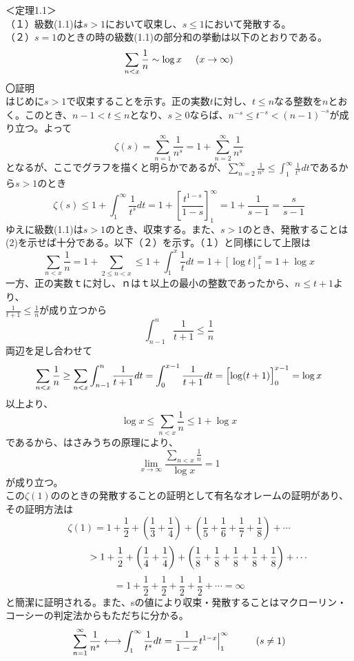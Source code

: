 \documentclass{jsarticle}
\begin{document}
＜定理1.1＞\\
（１）級数(1.1)は\(s>1\)において収束し、\(s\leq1\)において発散する。\\
（２）\(s=1\)のときの時の級数(1.1)の部分和の挙動は以下のとおりである。
\begin{equation}
\sum_{n<x}\frac{1}{n}\sim\log x\hspace{5mm}(x\rightarrow\infty)
\end{equation}
〇証明\\
はじめに\(s>1\)で収束することを示す。正の実数\(t\)に対し、\(t\leq n\)なる整数を\(n\)とおく。このとき、\(n-1<t\leq n\)となり、\(s\geq0\)ならば、\(n^{-s}\leq t^{-s}<(n-1)^{-s}\)が成り立つ。よって
\[\zeta(s)=\sum_{n=1}^{\infty}\frac{1}{n^{s}}=1+\sum_{n=2}^{\infty}\frac{1}{n^{s}}\]
となるが、ここでグラフを描くと明らかであるが、\(\displaystyle\sum_{n=2}^{\infty}\frac{1}{n^{s}}\leq\int_{1}^{\infty}\frac{1}{t^{s}}dt\)であるから\(s>1\)のとき
\[\zeta(s)\leq1+\int_{1}^{\infty}\frac{1}{t^{s}}dt=1+\left[\frac{t^{1-s}}{1-s}\right]_{1}^{\infty}=1+\frac{1}{s-1}=\frac{s}{s-1}\]
ゆえに級数(1.1)は\(s>1\)のとき、収束する。また、\(s>1\)のとき、発散することは(2)を示せば十分である。以下（２）を示す。（１）と同様にして上限は
\[\displaystyle\sum_{n<x}\frac{1}{n}=1+\sum_{2\leq n<x}\leq1+\int_{1}^{x}\frac{1}{t}dt=1+\left[\log t\right]_{1}^{x}=1+\log x\]
一方、正の実数ｔに対し、ｎはｔ以上の最小の整数であったから、\(n\leq t+1\)より、\\
\(\frac{1}{t+1}\leq\frac{1}{n}\)が成り立つから
\[\int_{n-1}^{n}\frac{1}{t+1}\leq\frac{1}{n}\]
両辺を足し合わせて
\[\displaystyle\sum_{n<x}\frac{1}{n}\geq\sum_{n<x}\int_{n-1}^{n}\frac{1}{t+1}dt=\int_{0}^{x-1}\frac{1}{t+1}dt=\Bigl[\log(t+1)\Bigr]_{0}^{x-1}=\log x\]
以上より、
\[\log x\leq\sum_{n<x}\frac{1}{n}\leq1+\log x\]
であるから、はさみうちの原理により、
\[\displaystyle\lim_{x\rightarrow\infty}\frac{\sum_{n<x}\frac{1}{n}}{\log x}=1\]
が成り立つ。\\
この\(\zeta(1)\)ののときの発散することの証明として有名なオレームの証明があり、その証明方法は
\[\zeta(1)=1+\frac{1}{2}+\left(\frac{1}{3}+\frac{1}{4}\right)+\left(\frac{1}{5}+\frac{1}{6}+\frac{1}{7}+\frac{1}{8}\right)+\cdots\]
\[\hspace{15mm}>1+\frac{1}{2}+\left(\frac{1}{4}+\frac{1}{4}\right)+\left(\frac{1}{8}+\frac{1}{8}+\frac{1}{8}+\frac{1}{8}+\frac{1}{8}\right)+\cdots\]
\[=1+\frac{1}{2}+\frac{1}{2}+\frac{1}{2}+\frac{1}{2}+\cdots=\infty\]
と簡潔に証明される。また、sの値により収束・発散することはマクローリン・コーシーの判定法からもただちに分かる。
\[\sum_{n=1}^{\infty}\frac{1}{n^{s}}\longleftrightarrow\int_{1}^{\infty}\frac{1}{t^{s}}dt=\frac{1}{1-x}t^{1-x}\Big|_{1}^{\infty}\hspace{10mm}(s\neq1)\]
\end{document}
